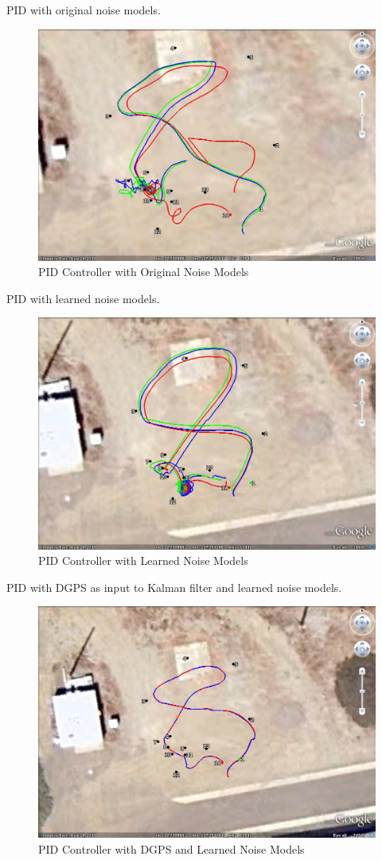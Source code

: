 PID with original noise models.

\begin{figure}[ht!]
	\centering
	\includegraphics[width=.75\textwidth]{images/GE/20101203_1755_kf_pidOrigQR}
	\caption{PID Controller with Original Noise Models}
	\label{fig:kfResults4}
\end{figure}

PID with learned noise models.

\begin{figure}[ht!]
	\centering
	\includegraphics[width=.75\textwidth]{images/GE/20101203_1751_kf_pidNewQR}
	\caption{PID Controller with Learned Noise Models}
	\label{fig:kfResults5}
\end{figure}

PID with DGPS as input to Kalman filter and learned noise models.

\begin{figure}[ht!]
	\centering
	\includegraphics[width=.75\textwidth]{images/GE/20101203_1803_kf_pidUsingDgpsNewQR}
	\caption{PID Controller with DGPS and Learned Noise Models}
	\label{fig:kfResults6}
\end{figure}

